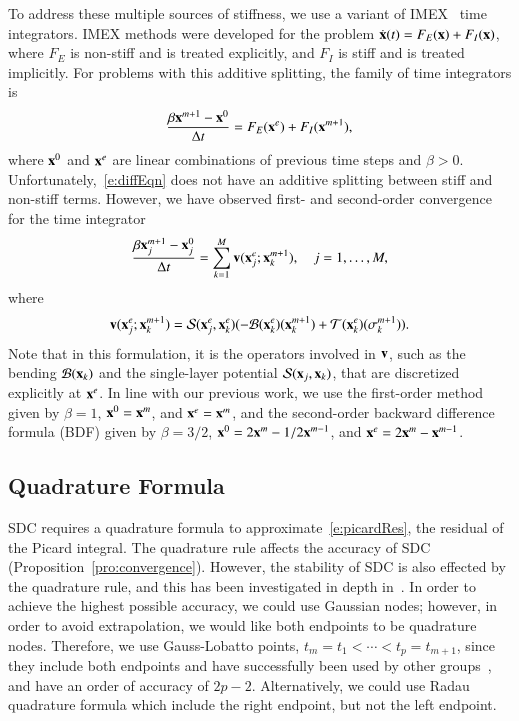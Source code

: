 To address these multiple sources of stiffness, we use a variant of
IMEX~\cite{asc:ruu:wet1995} time integrators.  IMEX methods were
developed for the problem $\dot{{\mathbf{x}}}(t) = F_{E}({\mathbf{x}}) + F_{I}({\mathbf{x}})$,
where $F_{E}$ is non-stiff and is treated explicitly, and $F_{I}$ is
stiff and is treated implicitly.  For problems with this additive
splitting, the family of time integrators is
\begin{align*}
  \frac{\beta {\mathbf{x}}^{m+1} - {\mathbf{x}}^{0}}{\Delta t} = 
    F_{E}({\mathbf{x}}^{e}) + F_{I}({\mathbf{x}}^{m+1}),
\end{align*}
where ${\mathbf{x}}^{0}$ and ${\mathbf{x}}^{e}$ are linear combinations of previous time
steps and $\beta > 0$.  Unfortunately,~\eqref{e:diffEqn} does not have
an additive splitting between stiff and non-stiff terms.  However, we
have observed first- and second-order convergence~\cite{qua:bir2014b}
for the time integrator
\begin{align*}
  \frac{\beta {\mathbf{x}}^{m+1}_{j} - {\mathbf{x}}^{0}_{j}}{\Delta t} =
    \sum_{k=1}^{M} {\mathbf{v}}({\mathbf{x}}_{j}^{e};{\mathbf{x}}_{k}^{m+1}), \quad j=1,\dots,M,
\end{align*}
where
\begin{align*}
  {\mathbf{v}}({\mathbf{x}}_{j}^{e};{\mathbf{x}}_{k}^{m+1}) = {\mathcal{S}}({\mathbf{x}}^{e}_{j},{\mathbf{x}}^{e}_{k})
    (-{\mathcal{B}}({\mathbf{x}}^{e}_{k})({\mathbf{x}}^{m+1}_{k}) +
      {\mathcal{T}}({\mathbf{x}}^{e}_{k})(\sigma^{m+1}_{k})).
\end{align*}
Note that in this formulation, it is the operators involved in ${\mathbf{v}}$,
such as the bending ${\mathcal{B}}({\mathbf{x}}_{k})$ and the single-layer potential
${\mathcal{S}}({\mathbf{x}}_{j},{\mathbf{x}}_{k})$, that are discretized explicitly at ${\mathbf{x}}^{e}$.
In line with our previous work, we use the first-order method given by
$\beta = 1$, ${\mathbf{x}}^{0}={\mathbf{x}}^{m}$, and ${\mathbf{x}}^{e}={\mathbf{x}}^{m}$, and the
second-order backward difference formula (BDF) given by $\beta = 3/2$,
${\mathbf{x}}^{0} = 2{\mathbf{x}}^{m} - 1/2{\mathbf{x}}^{m-1}$, and ${\mathbf{x}}^{e} = 2{\mathbf{x}}^{m} -
{\mathbf{x}}^{m-1}$.  

\subsection{Quadrature Formula}
\label{s:vesicleQuadrature}

SDC requires a quadrature formula to approximate~\eqref{e:picardRes},
the residual of the Picard integral.  The quadrature rule affects the
accuracy of SDC (Proposition~\ref{pro:convergence}).  However, the
stability of SDC is also effected by the quadrature rule, and this has
been investigated in depth in~\cite{bou:lay:min2003}.  In order to
achieve the highest possible accuracy, we could use Gaussian nodes;
however, in order to avoid extrapolation, we would like both endpoints
to be quadrature nodes.  Therefore, we use Gauss-Lobatto points, $t_{m}
= t_{1} < \cdots < t_{p} = t_{m+1}$, since they include both endpoints
and have successfully been used by other groups~\cite{bou:lay:min2003,
bou:min2010, min2003}, and have an order of accuracy of $2p-2$.
Alternatively, we could use Radau quadrature formula which include the
right endpoint, but not the left endpoint.


